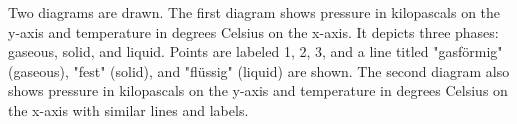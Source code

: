 Two diagrams are drawn. The first diagram shows pressure in kilopascals on the y-axis and temperature in degrees Celsius on the x-axis. It depicts three phases: gaseous, solid, and liquid. Points are labeled 1, 2, 3, and a line titled "gasförmig" (gaseous), "fest" (solid), and "flüssig" (liquid) are shown. The second diagram also shows pressure in kilopascals on the y-axis and temperature in degrees Celsius on the x-axis with similar lines and labels.